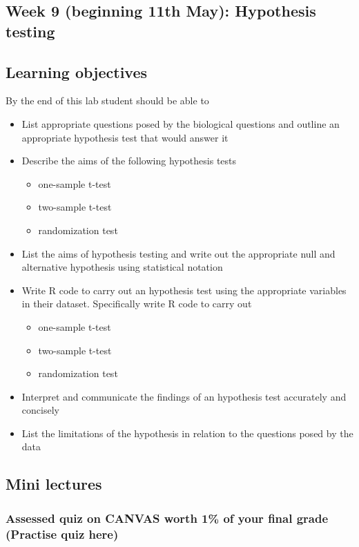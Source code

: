 \documentclass{article}
\begin{document}
\newpage

\subsection*{Week 9 (beginning 11th May): Hypothesis testing}





\subsection*{Learning objectives}
By the end of this lab student should be able to
\begin{itemize}
\item List appropriate questions posed by the biological questions and  outline an appropriate hypothesis test that would answer it
\item Describe the aims of the following hypothesis tests
  \begin{itemize}
  \item one-sample t-test
  \item two-sample t-test
  \item randomization test
  \end{itemize}
\item List the aims of hypothesis testing and write out the appropriate null and alternative hypothesis using statistical notation
\item Write R code to carry out an hypothesis test using the appropriate variables in their dataset. Specifically write R code to carry out
  \begin{itemize}
  \item one-sample t-test
  \item two-sample t-test
  \item randomization test
  \end{itemize}
\item Interpret and communicate the findings of an hypothesis test accurately and concisely
\item List the limitations of the hypothesis in relation to the questions posed by the data
\end{itemize}

\subsection*{Mini lectures}

\subsubsection*{Assessed quiz on CANVAS worth 1\% of your final grade (Practise quiz here)}
\end{document}
